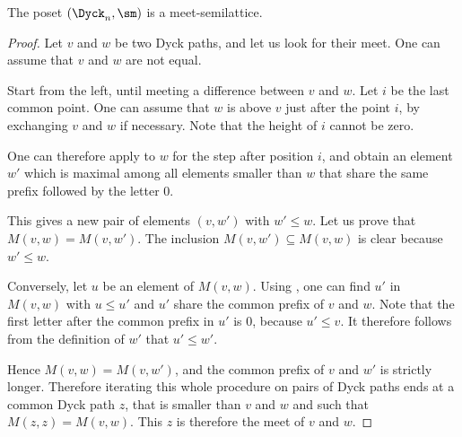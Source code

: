 \begin{theorem}
  The poset $(\Dyck_n, \sm)$ is a meet-semilattice.
\end{theorem}
\begin{proof}
  Let $v$ and $w$ be two Dyck paths, and let us look for their
  meet. One can assume that $v$ and $w$ are not equal.

  Start from the left, until meeting a difference between $v$ and
  $w$. Let $i$ be the last common point. One can assume that $w$ is
  above $v$ just after the point $i$, by exchanging $v$ and $w$ if
  necessary. Note that the height of $i$ cannot be zero.

  One can therefore apply  to $w$ for the step after
  position $i$, and obtain an element $w'$ which is maximal among all
  elements smaller than $w$ that share the same prefix followed by
  the letter $0$.

  This gives a new pair of elements $(v,w')$ with $w' \leq w$. Let us
  prove that $M(v,w) = M(v,w')$. The inclusion $M(v,w') \subseteq
  M(v,w)$ is clear because $w' \leq w$.

  Conversely, let $u$ be an element of $M(v,w)$. Using
  , one can find $u'$ in $M(v,w)$ with $u \leq
  u'$ and $u'$ share the common prefix of $v$ and $w$. Note that the
  first letter after the common prefix in $u'$ is $0$, because $u'
  \leq v$. It therefore follows from the definition of $w'$ that $u'
  \leq w'$.

  Hence $M(v,w) = M(v,w')$, and the common prefix of $v$ and $w'$ is
  strictly longer. Therefore iterating this whole procedure on pairs
  of Dyck paths ends at a common Dyck path $z$, that is smaller than
  $v$ and $w$ and such that $M(z,z) = M(v,w)$. This $z$ is therefore
  the meet of $v$ and $w$.
\end{proof}

